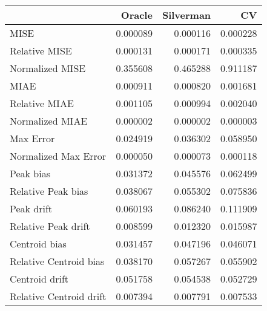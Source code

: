 \begin{tabular}{lrrr}
  \hline
 & Oracle & Silverman & CV \\ 
  \hline
MISE & 0.000089 & 0.000116 & 0.000228 \\ 
  Relative MISE & 0.000131 & 0.000171 & 0.000335 \\ 
  Normalized MISE & 0.355608 & 0.465288 & 0.911187 \\ 
  MIAE & 0.000911 & 0.000820 & 0.001681 \\ 
  Relative MIAE & 0.001105 & 0.000994 & 0.002040 \\ 
  Normalized MIAE & 0.000002 & 0.000002 & 0.000003 \\ 
  Max Error & 0.024919 & 0.036302 & 0.058950 \\ 
  Normalized Max Error & 0.000050 & 0.000073 & 0.000118 \\ 
  Peak bias & 0.031372 & 0.045576 & 0.062499 \\ 
  Relative Peak bias & 0.038067 & 0.055302 & 0.075836 \\ 
  Peak drift & 0.060193 & 0.086240 & 0.111909 \\ 
  Relative Peak drift & 0.008599 & 0.012320 & 0.015987 \\ 
  Centroid bias & 0.031457 & 0.047196 & 0.046071 \\ 
  Relative Centroid bias & 0.038170 & 0.057267 & 0.055902 \\ 
  Centroid drift & 0.051758 & 0.054538 & 0.052729 \\ 
  Relative Centroid drift & 0.007394 & 0.007791 & 0.007533 \\ 
   \hline
\end{tabular}
